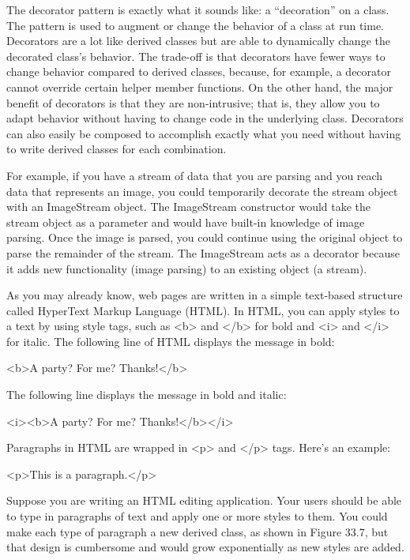 
The decorator pattern is exactly what it sounds like: a “decoration” on a class. The pattern is used to augment or change the behavior of a class at run time. Decorators are a lot like derived classes but are able to dynamically change the decorated class’s behavior. The trade-off is that decorators have fewer ways to change behavior compared to derived classes, because, for example, a decorator cannot override certain helper member functions. On the other hand, the major benefit of decorators is that they are non-intrusive; that is, they allow you to adapt behavior without having to change code in the underlying class. Decorators can also easily be composed to accomplish exactly what you need without having to write derived classes for each combination.

For example, if you have a stream of data that you are parsing and you reach data that represents an image, you could temporarily decorate the stream object with an ImageStream object. The ImageStream constructor would take the stream object as a parameter and would have built-in knowledge of image parsing. Once the image is parsed, you could continue using the original object to parse the remainder of the stream. The ImageStream acts as a decorator because it adds new functionality (image parsing) to an existing object (a stream).


As you may already know, web pages are written in a simple text-based structure called HyperText Markup Language (HTML). In HTML, you can apply styles to a text by using style tags, such as <b> and </b> for bold and <i> and </i> for italic. The following line of HTML displays the message in bold:

\begin{shell}
<b>A party? For me? Thanks!</b>
\end{shell}

The following line displays the message in bold and italic:

\begin{shell}
<i><b>A party? For me? Thanks!</b></i>
\end{shell}

Paragraphs in HTML are wrapped in <p> and </p> tags. Here’s an example:

\begin{shell}
<p>This is a paragraph.</p>
\end{shell}

Suppose you are writing an HTML editing application. Your users should be able to type in paragraphs of text and apply one or more styles to them. You could make each type of paragraph a new derived class, as shown in Figure 33.7, but that design is cumbersome and would grow exponentially as new styles are added.

